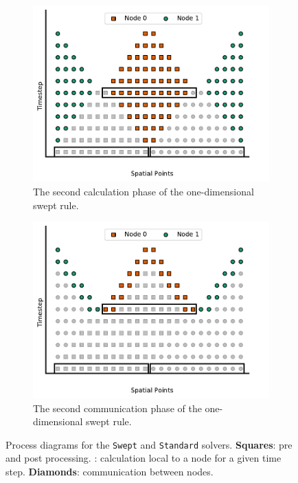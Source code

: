 \documentclass[mca,article,submit,moreauthors,pdftex]{Definitions/mdpi}
\def\Swept{\texttt{Swept}}
\def\Standard{\texttt{Standard}}
\begin{document}
\begin{figure}[htbp]
    \\
    \begin{subfigure}[b]{0.45\textwidth}
        \widefigure
        \includegraphics[scale=0.6]{figs/c_Diamond.pdf}
        \caption{The second calculation phase of the one-dimensional swept rule.}
        \label{fig:Diamond}
    \end{subfigure}
    \hfill
    \begin{subfigure}[b]{0.45\textwidth}
        \widefigure
        \includegraphics[scale=0.6]{figs/d_Comm2.pdf}
        \caption{The second communication phase of the one-dimensional swept rule.}
        \label{fig:1d-comm-2}
    \end{subfigure}
    \caption{Process diagrams for the \Swept{} and \Standard{} solvers. \textbf{Squares}: pre and post processing. : calculation local to a node for a given time step. \textbf{Diamonds}: communication between nodes.}
    \label{fig:1d-swept}
\end{figure}
\end{document}
